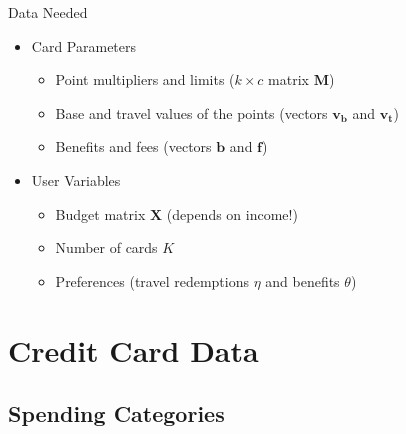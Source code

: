 \begin{frame}{Data Needed}
    \begin{itemize}
        \item Card Parameters
        \begin{itemize}
            \item Point multipliers and limits ($k\times c$ matrix $\mathbf{M}$)
            \item Base and travel values of the points (vectors $\mathbf{v_{b}}$ and $\mathbf{v_{t}}$)
            \item Benefits and fees (vectors $\mathbf{b}$ and $\mathbf{f}$)
        \end{itemize}
        \bigskip
        \item User Variables
        \begin{itemize}
            \item Budget matrix $\mathbf{X}$ (depends on income!)
            \item Number of cards $K$
            \item Preferences (travel redemptions $\eta$ and benefits $\theta$)
        \end{itemize}
    \end{itemize}
\end{frame}

\section{Credit Card Data}

\subsection{Spending Categories}

